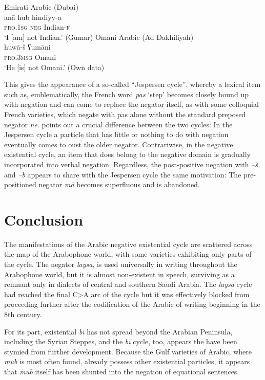 \documentclass[output=paper]{langsci/langscibook}
\begin{document}
\ea \label{ex:WiAR-36}
  \ea Emirati Arabic (Dubai)\\
  	\gll anā hub hindiyy-a\\
  	\textsc{pro.1sg} \textsc{neg} Indian-\textsc{f}\\
  	\glt ‘I [am] not Indian.’ (Gumar)
  \ex Omani Arabic (Ad Dakhiliyah)\\
  	\gll huwā-š ʕumāni\\
  	\textsc{pro.3msg} Omani\\
  	\glt ‘He [is] not Omani.’ (Own data)
\z \z

This gives the appearance of a so-called “Jespersen cycle”, whereby a lexical item such as, emblematically, the French word \textit{pas} ‘step’ becomes closely bound up with negation and can come to replace the negator itself, as with some colloquial French varieties, which negate with pas alone without the standard preposed negator \textit{ne}. \citep[53]{Veselinova2016} points out a crucial difference between the two cycles: In the Jespersen cycle a particle that has little or nothing to do with negation eventually comes to oust the older negator. Contrariwise, in the negative existential cycle, an item that does belong to the negative domain is gradually incorporated into verbal negation. Regardless, the post-positive negation with \textit{–š} and \textit{–b} appears to share with the Jespersen cycle the same motivation: The pre-positioned negator \textit{mā} becomes superfluous and is abandoned.

\section{Conclusion} \label{s:WiAR-6}

The manifestations of the Arabic negative existential cycle are scattered across the map of the Arabophone world, with some varieties exhibiting only parts of the cycle. The negator \textit{laysa}, is used universally in writing throughout the Arabophone world, but it is almost non-existent in speech, surviving as a remnant only in dialects of central and southern Saudi Arabia. The \textit{laysa} cycle had reached the final C>A arc of the cycle but it was effectively blocked from proceeding further after the codification of the Arabic of writing beginning in the 8th century.

For its part, existential \textit{bī} has not spread beyond the Arabian Peninsula, including the Syrian Steppes, and the \textit{bī} cycle, too, appears the have been stymied from further development. Because the Gulf varieties of Arabic, where \textit{mub} is most often found, already possess other existential particles, it appears that \textit{mub} itself has been shunted into the negation of equational sentences.
\end{document}
